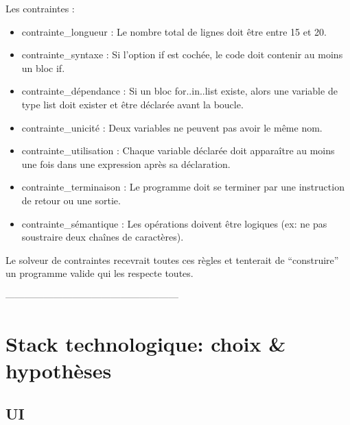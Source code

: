 \documentclass[11pt,a4paper]{article}
\begin{document}
Les contraintes : 
\begin{itemize}
    \item contrainte\_longueur : Le nombre total de lignes doit être entre 15 et 20.
    \item contrainte\_syntaxe : Si l'option if est cochée, le code doit contenir au moins un bloc if.
    \item contrainte\_dépendance : Si un bloc for..in..list existe, alors une variable de type list doit exister et être déclarée avant la boucle.
    \item contrainte\_unicité : Deux variables ne peuvent pas avoir le même nom.
    \item contrainte\_utilisation : Chaque variable déclarée doit apparaître au moins une fois dans une expression après sa déclaration.
    \item contrainte\_terminaison : Le programme doit se terminer par une instruction de retour ou une sortie.
    \item contrainte\_sémantique : Les opérations doivent être logiques (ex: ne pas soustraire deux chaînes de caractères).
\end{itemize}
Le solveur de contraintes recevrait toutes ces règles et tenterait de ``construire'' un programme valide qui les respecte toutes.


------------------------------------------------------
\section*{Stack technologique: choix \& hypothèses}

\subsection*{UI}
\end{document}
